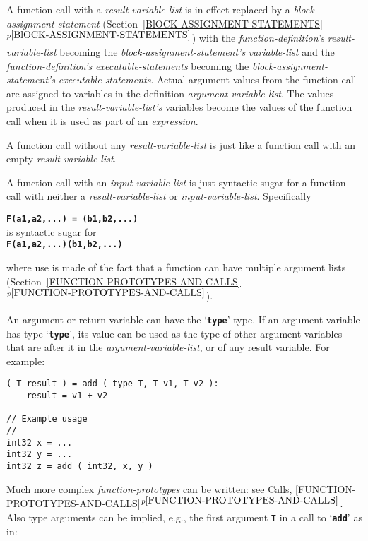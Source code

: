 \documentclass[12pt]{article}
\newcommand{\TT}[1]{{\tt \bfseries #1}}
\newcommand{\itemref}[1]{\ref{#1}$^{p\pageref{#1}}$}
\newenvironment{indpar}[1][0.3in]%
	{\begin{list}{}%
		     {\setlength{\itemsep}{0in}%
		      \setlength{\topsep}{0in}%
		      \setlength{\parsep}{1ex}%
		      \setlength{\labelwidth}{#1}%
		      \setlength{\leftmargin}{#1}%
		      \addtolength{\leftmargin}{\labelsep}}%
	 \item}%
	{\end{list}}
\begin{document}
A function call with a {\em result-variable-list}
is in effect replaced by a {\em block-assignment-statement}
(Section~\itemref{BlOCK-ASSIGNMENT-STATEMENTS})
with the {\em function-definition's} {\em result-variable-list} becoming the 
{\em block-assignment-statement's} {\em variable-list} and the
{\em function-definition's} {\em executable-statements} becoming the 
{\em block-assignment-statement's} {\em executable-statements}.
Actual argument values from the function call are assigned to variables in
the definition {\em argument-variable-list}.  The values produced in
the {\em result-variable-list's} variables become the values of the
function call when it is used as part of an {\em expression}.

A function call without any {\em result-variable-list}
is just like a function call with an empty
{\em result-variable-list}.

A function call with an {\em input-variable-list} is just syntactic
sugar for a function call with neither a {\em result-variable-list}
or {\em input-variable-list}.  Specifically
\begin{center}
\TT{F(a1,a2,...)~=~(b1,b2,...)} \\
is syntactic sugar for \\
\TT{F(a1,a2,...)(b1,b2,...)} \\
\end{center}

where use is made of the fact that a function can have multiple
argument lists (Section~\itemref{FUNCTION-PROTOTYPES-AND-CALLS}).

An argument or return variable can have the `\TT{type}' type.
If an argument variable has type `\TT{type}', its value can be used as the
type of other argument variables that are
after it in the {\em argument-variable-list},
or of any result variable.  For example:

\begin{indpar}\begin{verbatim}
( T result ) = add ( type T, T v1, T v2 ):
    result = v1 + v2

// Example usage
//
int32 x = ...
int32 y = ...
int32 z = add ( int32, x, y )
\end{verbatim}\end{indpar}

Much more complex {\em function-prototypes} can be written:
see Calls, \itemref{FUNCTION-PROTOTYPES-AND-CALLS}.
Also type arguments can be implied, e.g., the first argument \TT{T}
in a call to `\TT{add}' as in:
\end{document}
